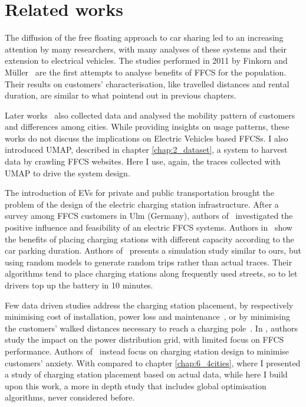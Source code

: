 \section{Related works}
\label{sec:7_2_related}


The diffusion of the free floating approach to car sharing led to an increasing attention by many researchers, with many analyses of these systems and their extension to electrical vehicles. The studies performed in 2011 by Finkorn and M\"{u}ller~\cite{Firnkorn2011,FM12} are the first attempts to analyse benefits of FFCS for the population. Their results on customers' characterisation, like travelled distances and rental duration, are similar to what pointend out in previous chapters.

Later works~\cite{Car2GoGlobalAnalysis,Kortum2016,Schmoller2015} also collected data and analysed the mobility pattern of customers and differences among cities. While providing insights on usage patterns, these works do not discuss the implications on Electric Vehicles based FFCSs. I  also introduced UMAP, described in chapter \ref{chap:2_dataset}, a system to harvest data by crawling FFCS websites. Here I use, again, the traces collected with UMAP to drive the system design.

The introduction of EVs for private and public transportation brought the problem of the design of the electric charging station infrastructure.
After a survey among FFCS customers in Ulm (Germany), authors of~\cite{FM15}  investigated the positive influence and feasibility of an electric FFCS systems.
Authors in~\cite{ChargingStationForVehicularNetworks} show the benefits of placing charging stations with different capacity according to the car parking duration. 
Authors of~\cite{bi2017simulation} presents a simulation study similar to ours, but using random models to generate random trips rather than actual traces. Their algorithms tend to place charging stations along frequently used streets, so to let drivers top up the battery in 10 minutes.

Few data driven studies address the charging station placement,  by respectively minimising  cost of installation, power loss and maintenance~\cite{taormina,PlacementAndPowergrid,mipCSPpechino}, or by minimising the customers' walked distances necessary to reach a charging pole~\cite{placementAustin}.  
In \cite{PlacementAndPowergrid}, authors study the impact on the power distribution grid, with limited focus on FFCS performance. Authors of~\cite{mipCSPpechino} instead focus on charging station design to minimise customers' anxiety. 
With compared to chapter \ref{chap:6_4cities}, where I presented a study of charging station placement based on actual data, while here I build upon this work, a more in depth study that includes global optimisation algorithms, never considered before.

